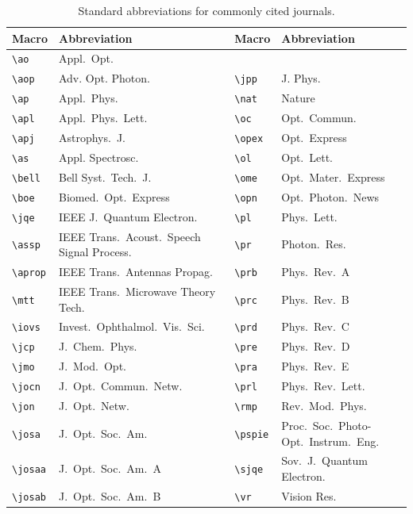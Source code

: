 \documentclass[10pt,letterpaper]{article}
\begin{document}
\begin{table}[htbp]
\centering\caption{Standard abbreviations
 for commonly cited journals.}
\begin{tabular}{lp{1.7in}|lp{1.7in}}
\hline
Macro        & Abbreviation                & Macro        & Abbreviation          \\ \hline
\verb+\ao+   & Appl.\  Opt.\               &   &       \\
\verb+\aop+  & Adv. Opt. Photon.           & \verb+\jpp+  & J. Phys.              \\
\verb+\ap+   & Appl.\  Phys.\              & \verb+\nat+  & Nature                \\
\verb+\apl+  & Appl.\ Phys.\ Lett.\        & \verb+\oc+   & Opt.\ Commun.\        \\
\verb+\apj+  & Astrophys.\ J.\             & \verb+\opex+ & Opt.\ Express         \\
\verb+\as+   & Appl. Spectrosc.            & \verb+\ol+   & Opt.\ Lett.\          \\
\verb+\bell+ & Bell Syst.\ Tech.\ J.\      & \verb+\ome+  & Opt.\ Mater.\ Express \\
\verb+\boe+  & Biomed.\ Opt.\ Express      & \verb+\opn+  & Opt.\ Photon.\ News   \\
\verb+\jqe+ & IEEE J.\ Quantum Electron.\  & \verb+\pl+   & Phys.\ Lett.\         \\
\verb+\assp+ & IEEE Trans.\ Acoust.\ Speech Signal Process.\ & \verb+\pr+ & Photon.\ Res.\ \\
\verb+\aprop+ & IEEE Trans.\  Antennas Propag.\    & \verb+\prb+ & Phys.\ Rev.\ A   \\
\verb+\mtt+ & IEEE Trans.\ Microwave Theory Tech.\ & \verb+\prc+ & Phys.\ Rev.\ B   \\
\verb+\iovs+ & Invest.\ Ophthalmol.\ Vis.\ Sci.\   & \verb+\prd+ & Phys.\ Rev.\ C   \\
\verb+\jcp+ & J.\ Chem.\ Phys.\            & \verb+\pre+ & Phys.\ Rev.\ D   \\
\verb+\jmo+ & J.\ Mod.\ Opt.\              & \verb+\pra+ & Phys.\ Rev.\ E   \\
\verb+\jocn+ & J.\ Opt.\ Commun.\ Netw.\   & \verb+\prl+ & Phys.\ Rev.\ Lett.\    \\
\verb+\jon+ & J.\ Opt.\ Netw.\             & \verb+\rmp+ & Rev.\ Mod.\ Phys.\    \\
\verb+\josa+ & J.\ Opt.\ Soc.\ Am.\        & \verb+\pspie+ & Proc.\ Soc.\ Photo-Opt.\ Instrum.\ Eng.\   \\
\verb+\josaa+ & J.\ Opt.\ Soc.\ Am.\ A     & \verb+\sjqe+ & Sov.\ J.\ Quantum Electron.\   \\
\verb+\josab+ & J.\ Opt.\ Soc.\ Am.\ B     & \verb+\vr+ & Vision Res.\   \\ \hline
\end{tabular}
\end{table}
\end{document}
